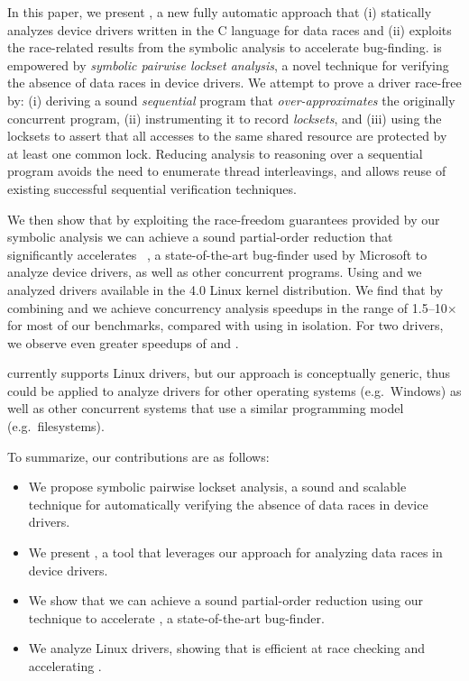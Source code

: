 In this paper, we present \whoop, a new fully automatic approach that (i) statically analyzes device drivers written in the C language for data races and (ii) exploits the race-related results from the symbolic analysis to accelerate bug-finding. \whoop is empowered by \emph{symbolic pairwise lockset analysis}, a novel technique for verifying the absence of data races in device drivers. We attempt to prove a driver race-free by: (i) deriving a sound \emph{sequential} program that \emph{over-approximates} the originally concurrent program, (ii) instrumenting it to record \emph{locksets}, and (iii) using the locksets to assert that all accesses to the same shared resource are protected by at least one common lock. Reducing analysis to reasoning over a sequential program avoids the need to enumerate thread interleavings, and allows reuse of existing successful sequential verification techniques.

We then show that by exploiting the race-freedom guarantees provided by our symbolic analysis we can achieve a sound partial-order reduction that significantly accelerates \corral~\cite{lal2012corral}, a state-of-the-art bug-finder used by Microsoft to analyze device drivers, as well as other concurrent programs. Using \whoop and \corral we analyzed \sizeOfBenchmarks drivers available in the 4.0 Linux kernel distribution.  We find that by combining \whoop and \corral we achieve concurrency analysis speedups in the range of 1.5--10$\times$ for most of our benchmarks, compared with using \corral in isolation.  For two drivers, we observe even greater speedups of  and .

\whoop currently supports Linux drivers, but our approach is conceptually generic, thus could be applied to analyze drivers for other operating systems (e.g.\ Windows) as well as other concurrent systems that use a similar programming model (e.g.\ filesystems).

To summarize, our contributions are as follows:
\begin{itemize}
\item We propose symbolic pairwise lockset analysis, a sound and scalable technique for automatically verifying the absence of data races in device drivers.
\item We present \whoop, a tool that leverages our approach for analyzing data races in device drivers.
\item We show that we can achieve a sound partial-order reduction using our technique to accelerate \corral, a state-of-the-art bug-finder.
\item We analyze \sizeOfBenchmarks Linux drivers, showing that \whoop is efficient at race checking and accelerating \corral.
\end{itemize}
